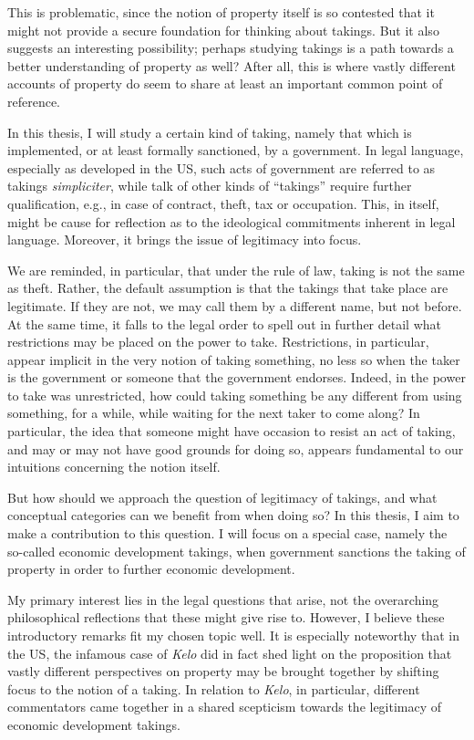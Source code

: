 This is problematic, since the notion of property itself is so contested that it might not provide a secure foundation for thinking about takings. But it also suggests an interesting possibility; perhaps studying takings is a path towards a better understanding of property as well? After all, this is where vastly different accounts of property do seem to share at least an important common point of reference.

In this thesis, I will study a certain kind of taking, namely that which is implemented, or at least formally sanctioned, by a government. In legal language, especially as developed in the US, such acts of government are referred to as takings {\it simpliciter}, while talk of other kinds of ``takings'' require further qualification, e.g., in case of contract, theft, tax or occupation. This, in itself, might be cause for reflection as to the ideological commitments inherent in legal language. Moreover, it brings the issue of legitimacy into focus. 

We are reminded, in particular, that under the rule of law, taking is not the same as theft. Rather, the default assumption is that the takings that take place are legitimate. If they are not, we may call them by a different name, but not before. At the same time, it falls to the legal order to spell out in further detail what restrictions may be placed on the power to take. Restrictions, in particular, appear implicit in the very notion of taking something, no less so when the taker is the government or someone that the government endorses. Indeed, in the power to take was unrestricted, how could taking something be any different from using something, for a while, while waiting for the next taker to come along? In particular, the idea that someone might have occasion to resist an act of taking, and may or may not have good grounds for doing so, appears fundamental to our intuitions concerning the notion itself.

But how should we approach the question of legitimacy of takings, and what conceptual categories can we benefit from when doing so? In this thesis, I aim to make a contribution to this question. I will focus on a special case, namely the so-called economic development takings, when government sanctions the taking of property in order to further economic development. 

My primary interest lies in the legal questions that arise, not the overarching philosophical reflections that these might give rise to. However, I believe these introductory remarks fit my chosen topic well. It is especially noteworthy that in the US, the infamous case of {\it Kelo} did in fact shed light on the proposition that vastly different perspectives on property may be brought together by shifting focus to the notion of a taking. In relation to {\it Kelo}, in particular, different commentators came together in a shared scepticism towards the legitimacy of economic development takings.

